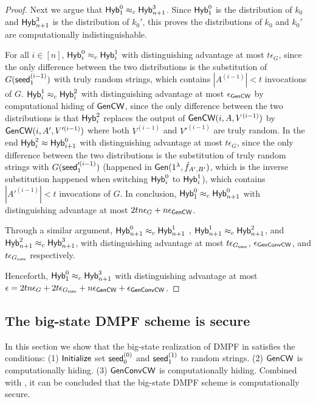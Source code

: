 \begin{proof}
    Next we argue that ${\sf Hyb}_1^0\approx_c{\sf Hyb}_{n+1}^3$. Since ${\sf Hyb}_1^0$ is the distribution of $k_0$ and ${\sf Hyb}_{n+1}^3$ is the distribution of $k_0'$, this proves the distributions of $k_0$ and $k_0'$ are computationally indistinguishable. 
    
    For all $i\in[n]$, ${\sf Hyb}_i^0\approx_c{\sf Hyb}_i^1$ with distinguishing advantage at most $t\epsilon_G$, since the only difference between the two distributions is the substitution of $G({\sf seed}_1^{(i-1)})$ with truly random strings, which contains $|A^{(i-1)}|<t$ invocations of $G$. ${\sf Hyb}_i^1\approx_c{\sf Hyb}_i^2$ with distinguishing advantage at most $\epsilon_{{\sf Gen}{\sf CW}}$ by computational hiding of ${\sf Gen}{\sf CW}$, since the only difference between the two distributions is that ${\sf Hyb}_i^2$ replaces the output of ${\sf Gen}{\sf CW}(i,A,V^{(i-1)})$ by ${\sf Gen}{\sf CW}(i,A',V'^{(i-1)})$ where both $V^{(i-1)}$ and $V'^{(i-1)}$ are truly random. In the end ${\sf Hyb}_i^2\approx {\sf Hyb}_{i+1}^0$ with distinguishing advantage at most $t\epsilon_G$, since the only difference between the two distributions is the substitution of truly random strings with  $G({\sf seed}_1'^{(i-1)})$ (happened in ${\sf Gen}(1^\lambda, \hat{f}_{A',B'})$, which is the inverse substitution happened when switching ${\sf Hyb}_i^0$ to ${\sf Hyb}_i^1$), which contains $|A'^{(i-1)}|<t$ invocations of $G$. In conclusion, ${\sf Hyb}_1^0\approx_c {\sf Hyb}_{n+1}^0$ with distinguishing advantage at most $2tn\epsilon_{G}+n\epsilon_{{\sf Gen}{\sf CW}}$. 

    Through a similar argument, ${\sf Hyb}_{n+1}^0\approx_c{\sf Hyb}_{n+1}^1$ , ${\sf Hyb}_{n+1}^1\approx_c{\sf Hyb}_{n+1}^2$, and ${\sf Hyb}_{n+1}^2  \approx_c{\sf Hyb}_{n+1}^3$, with distinguishing advantage at most $t\epsilon_{G_{\sf conv}}$, $\epsilon_{{\sf Gen}{\sf Conv}{\sf CW}}$, and $t\epsilon_{G_{\sf conv}}$ respectively. 

    Henceforth, ${\sf Hyb}_1^0\approx_c{\sf Hyb}_{n+1}^3$ with distinguishing advantage at most $\epsilon = 2tn\epsilon_{G}+2t \epsilon_{G_{\sf conv}}+n\epsilon_{{\sf Gen}{\sf CW}} +\epsilon_{{\sf Gen}{\sf Conv}{\sf CW}}$.  
\end{proof}

\subsection{The big-state DMPF scheme is secure}\label{sec:big-state_security_proof}
In this section we show that the big-state realization of DMPF in  satisfies the conditions: (1) $\sf Initialize$ set ${\sf seed}_0^{(0)}$ and ${\sf seed}_1^{(1)}$ to random strings. (2) ${\sf Gen}{\sf CW}$ is computationally hiding. (3) ${\sf Gen}{\sf Conv}{\sf CW}$ is computationally hiding. Combined with , it can be concluded that the big-state DMPF scheme is computationally secure. 

